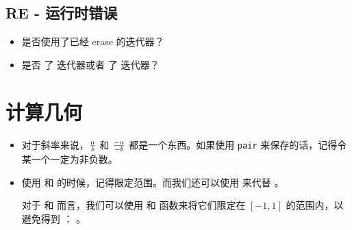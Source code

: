 \subsection{RE - 运行时错误}
\begin{itemize}
    \item 是否使用了已经 erase 的迭代器？
    \item 是否 \cmd{--} 了  迭代器或者 \cmd{++} 了  迭代器？
\end{itemize}

\section{计算几何}
\begin{itemize}
    \item 对于斜率来说，$a \over b$ 和 $-a \over -b$ 都是一个东西。如果使用
        \verb|pair| 来保存的话，记得令某一个一定为非负数。
    \item 使用  和  的时候，记得限定范围。而我们还可以使用
         来代替 。

        对于  和  而言，我们可以使用  和 
        函数来将它们限定在 $[-1, 1]$ 的范围内，以避免得到 ：
        。
\end{itemize}
